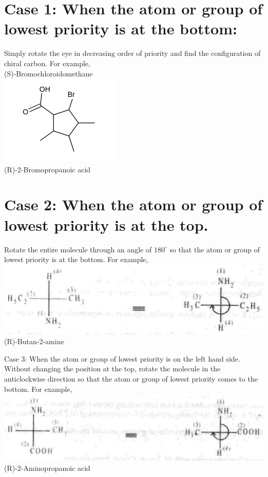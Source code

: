 \documentclass[10pt]{article}
\begin{document}
\section*{Case 1: When the atom or group of lowest priority is at the bottom:}
Simply rotate the eye in decreasing order of priority and find the configuration of chiral carbon. For example,\\
(S)-Bromochloroidomethane\\
\includegraphics{smile-5ec17d5a26d5e561d9982d5928b2d892c9b1d192}\\
(R)-2-Bromopropanoic acid

\section*{Case 2: When the atom or group of lowest priority is at the top.}
Rotate the entire molecule through an angle of $180^{\circ}$ so that the atom or group of lowest priority is at the bottom. For example,\\
\includegraphics[max width=\textwidth, center]{2025_01_28_8470952b98110cec3aabg-054(2)}\\
(R)-Butan-2-amine

Case 3: When the atom or group of lowest priority is on the left hand side.\\
Without changing the position at the top, rotate the molecule in the anticlockwise direction so that the atom or group of lowest priority comes to the bottom. For example,\\
\includegraphics[max width=\textwidth, center]{2025_01_28_8470952b98110cec3aabg-054(1)}\\
(R)-2-Aminopropanoic acid
\end{document}
